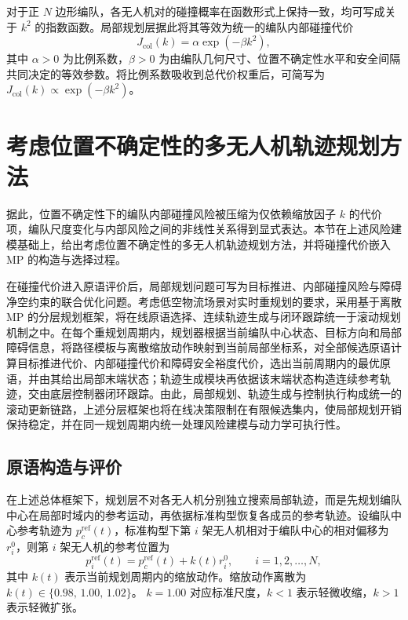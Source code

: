对于正 $N$ 边形编队，各无人机对的碰撞概率在函数形式上保持一致，均可写成关于 $k^{2}$ 的指数函数。局部规划层据此将其等效为统一的编队内部碰撞代价
\begin{equation}
J_{\mathrm{col}}(k) = \alpha \exp(-\beta k^{2}),
\label{eq:3_19}
\end{equation}
其中 $\alpha>0$ 为比例系数，$\beta>0$ 为由编队几何尺寸、位置不确定性水平和安全间隔共同决定的等效参数。将比例系数吸收到总代价权重后，可简写为 $J_{\mathrm{col}}(k) \propto \exp(-\beta k^{2})$。

\section{考虑位置不确定性的多无人机轨迹规划方法}

据此，位置不确定性下的编队内部碰撞风险被压缩为仅依赖缩放因子 $k$ 的代价项，编队尺度变化与内部风险之间的非线性关系得到显式表达。本节在上述风险建模基础上，给出考虑位置不确定性的多无人机轨迹规划方法，并将碰撞代价嵌入 MP 的构造与选择过程。

在碰撞代价进入原语评价后，局部规划问题可写为目标推进、内部碰撞风险与障碍净空约束的联合优化问题。考虑低空物流场景对实时重规划的要求，采用基于离散 MP 的分层规划框架，将在线原语选择、连续轨迹生成与闭环跟踪统一于滚动规划机制之中。在每个重规划周期内，规划器根据当前编队中心状态、目标方向和局部障碍信息，将路径模板与离散缩放动作映射到当前局部坐标系，对全部候选原语计算目标推进代价、内部碰撞代价和障碍安全裕度代价，选出当前周期内的最优原语，并由其给出局部末端状态；轨迹生成模块再依据该末端状态构造连续参考轨迹，交由底层控制器闭环跟踪。由此，局部规划、轨迹生成与控制执行构成统一的滚动更新链路，上述分层框架也将在线决策限制在有限候选集内，使局部规划开销保持稳定，并在同一规划周期内统一处理风险建模与动力学可执行性。

\subsection{原语构造与评价}

在上述总体框架下，规划层不对各无人机分别独立搜索局部轨迹，而是先规划编队中心在局部时域内的参考运动，再依据标准构型恢复各成员的参考轨迹。设编队中心参考轨迹为 $p_{c}^{\mathrm{ref}}(t)$，标准构型下第 $i$ 架无人机相对于编队中心的相对偏移为 $r_{i}^{0}$，则第 $i$ 架无人机的参考位置为
\[
p_{i}^{\mathrm{ref}}(t) = p_{c}^{\mathrm{ref}}(t) + k(t) r_{i}^{0}, \qquad i=1,2,\ldots,N,
\]
其中 $k(t)$ 表示当前规划周期内的缩放动作。缩放动作离散为 $k(t) \in \{0.98,\,1.00,\,1.02\}$。
$k=1.00$ 对应标准尺度，$k<1$ 表示轻微收缩，$k>1$ 表示轻微扩张。

